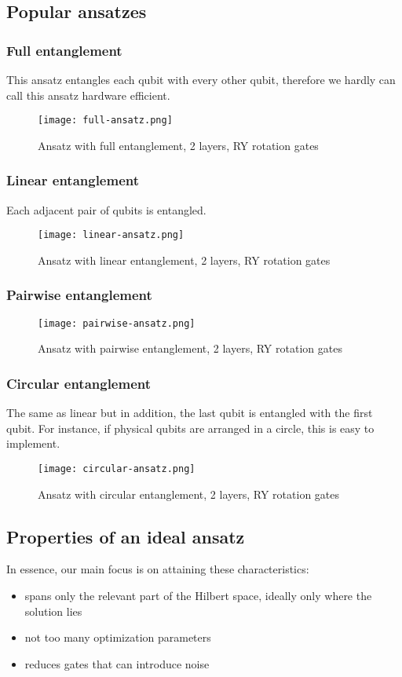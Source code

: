 \subsection{Popular ansatzes}
\subsubsection{Full entanglement}
This ansatz entangles each qubit with every other qubit, therefore we hardly can call this ansatz hardware efficient.
\begin{figure}[H]
    \texttt{[image: full-ansatz.png]}
    \caption{Ansatz with full entanglement, 2 layers, RY rotation gates}
\end{figure}
\subsubsection{Linear entanglement}
Each adjacent pair of qubits is entangled. 
\begin{figure}[H]
    \texttt{[image: linear-ansatz.png]}
    \caption{Ansatz with linear entanglement, 2 layers, RY rotation gates}
\end{figure}
\subsubsection{Pairwise entanglement}
\begin{figure}[H]
    \texttt{[image: pairwise-ansatz.png]}
    \caption{Ansatz with pairwise entanglement, 2 layers, RY rotation gates}
\end{figure}
\subsubsection{Circular entanglement}
The same as linear but in addition, the last qubit is entangled with the first qubit. For instance, if physical qubits are arranged in a circle, this is easy to implement.
\begin{figure}[H]
    \texttt{[image: circular-ansatz.png]}
    \caption{Ansatz with circular entanglement, 2 layers, RY rotation gates}
\end{figure}

\subsection{Properties of an ideal ansatz}
In essence, our main focus is on attaining these characteristics:
\begin{itemize}
    \item spans only the relevant part of the Hilbert space, ideally only where the solution lies
    \item not too many optimization parameters
    \item reduces gates that can introduce noise
\end{itemize}